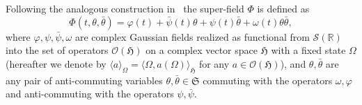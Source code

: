 \documentclass[a4paper,10pt]{article}
\begin{document}
Following the analogous construction
in~{\cite{Klein1984,albeverio_elliptic_2018}} the super-field $\Phi$ is
defined as
\[ \Phi (t, \theta, \bar{\theta}) = \varphi (t) + \bar{\psi} (t) \theta + \psi
   (t) \bar{\theta} + \omega (t) \theta \bar{\theta}, \]
where $\varphi, \psi, \bar{\psi}, \omega$ are complex Gaussian fields realized
as functional from $\mathcal{S} (\mathbb{R})$ into the set of operators
$\mathcal{O} (\mathfrak{H})$ on a complex vector space $\mathfrak{H}$ with a
fixed state $\Omega$ (hereafter we denote by $\langle a \rangle_{\Omega} =
\langle \Omega, a (\Omega) \rangle_{\mathfrak{H}}$ for any $a \in \mathcal{O}
(\mathfrak{H})$), and $\theta, \bar{\theta}$ are any pair of anti-commuting
variables $\theta, \bar{\theta} \in \mathfrak{S}$ commuting with the operators
$\omega, \varphi$ and anti-commuting with the operators $\psi, \bar{\psi}$.
\end{document}
